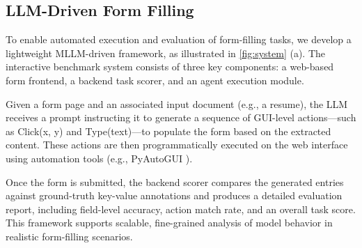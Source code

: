 \documentclass[sigconf, screen, review]{acmart}
\begin{document}


\subsection{LLM-Driven Form Filling}
To enable automated execution and evaluation of form-filling tasks, we develop a lightweight MLLM-driven framework, as illustrated in \cref{fig:system} (a). The interactive benchmark system consists of three key components: a web-based form frontend, a backend task scorer, and an agent execution module.

Given a form page and an associated input document (e.g., a resume), the LLM receives a prompt instructing it to generate a sequence of GUI-level actions—such as Click(x, y) and Type(text)—to populate the form based on the extracted content. These actions are then programmatically executed on the web interface using automation tools (e.g., PyAutoGUI \cite{pyautogui}).

Once the form is submitted, the backend scorer compares the generated entries against ground-truth key-value annotations and produces a detailed evaluation report, including field-level accuracy, action match rate, and an overall task score. This framework supports scalable, fine-grained analysis of model behavior in realistic form-filling scenarios.
\end{document}
